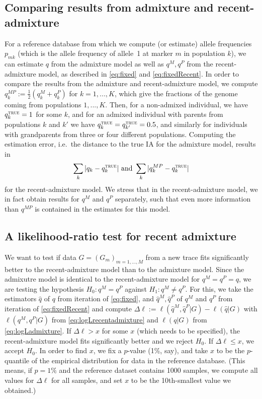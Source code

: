 \documentclass[12pt]{article}
\theoremstyle{definition}
\begin{document}
\subsection{Comparing results from admixture and recent-admixture}
For a reference database from which we compute (or estimate) allele
frequencies $p_{mk}$ (which is the allele frequency of allele~1 at
marker $m$ in population $k$), we can estimate $q$ from the admixture
model as well as $q^M,q^P$ from the recent-admixture model, as
described in \eqref{eq:fixed} and \eqref{eq:fixedRecent}. In order to
compare the results from the admixture and recent-admixture model, we
compute $q_k^{MP} := \tfrac 12 (q_k^M + q_k^P)$ for $k=1,...,K$, which
give the fractions of the genome coming from populations
$1,...,K$. Then, for a non-admixed individual, we have
$q_k^{\text{\sc true}} = 1$ for some $k$, and for an admixed
individual with parents from populations $k$ and $k'$ we have
$q_k^{\text{\sc true}} =q_{k'}^{\text{\sc true}} = 0.5$, and similarly
for individuals with grandparents from three or four different
populations. Computing the estimation error, i.e.\ the distance to the
true IA for the admixture model, results in
\begin{align}
  \label{eq:error}
  \sum_k |q_k - q_k^{\text{\sc true}}| \text{  and }\sum_k |q_k^{MP} - q_k^{\text{\sc true}}|
\end{align}
for the recent-admixture model. We stress that in the recent-admixture
model, we in fact obtain results for $q^M$ and $q^P$ separately, such
that even more information than $q^{MP}$ is contained in the estimates
for this model.

\subsection{A likelihood-ratio test for recent admixture}
We want to test if data $G = (G_m)_{m=1,...,M}$ from a new trace fits
significantly better to the recent-admixture model than to the
admixture model. Since the admixutre model is identical to the
recent-admixture model for $q^M = q^P = q$, we are testing the
hypothesis $H_0: q^M = q^P$ against $H_1: q^M\neq q^P$. For this, we
take the estimators $\hat q$ of $q$ from iteration of
\eqref{eq:fixed}, and $\hat q^M, \hat q^P$ of $q^M$ and $q^P$ from
iteration of \eqref{eq:fixedRecent} and compute
$\Delta\ell := \ell(\hat q^M, \hat q^P|G) - \ell(\hat q|G)$ with
$\ell(q^M, q^P|G)$ from \eqref{eq:logLrecentadmixture} and $\ell(q|G)$
from \eqref{eq:logLadmixture}. If $\Delta \ell >x$ for some $x$ (which
needs to be specified), the recent-admixture model fits significantly
better and we reject $H_0$. If $\Delta \ell \leq x$, we accept
$H_0$. In order to find $x$, we fix a $p$-value (1\%, say), and take
$x$ to be the $p$-quantile of the empirical distribution for data in
the reference database. (This means, if $p=1\%$ and the reference
dataset contains 1000 samples, we compute all values for $\Delta\ell$
for all samples, and set $x$ to be the 10th-smallest value we
obtained.)
\end{document}
